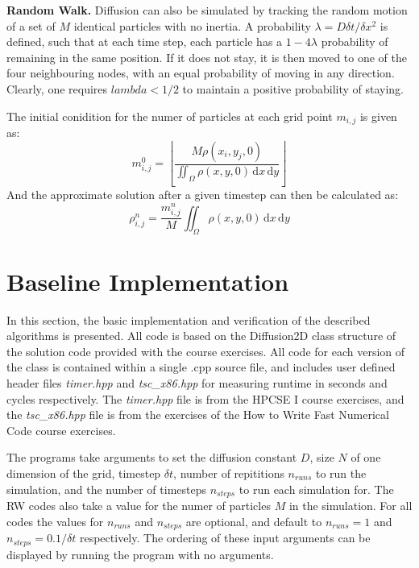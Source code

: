 \documentclass[letterpaper]{article}
\newcommand{\mypar}[1]{{\bf #1.}}
\begin{document}
\mypar{Random Walk}
Diffusion can also be simulated by tracking the random motion of a set of $M$ identical particles with no inertia. A probability $\lambda=D\delta t/\delta x^2$ is defined, such that at each time step, each particle has a $1-4\lambda$ probability of remaining in the same position. If it does not stay, it is then moved to one of the four neighbouring nodes, with an equal probability of moving in any direction. Clearly, one requires $lambda<1/2$ to maintain a positive probability of staying.

The initial conidition for the numer of particles at each grid point $m_{i,j}$ is given as:
\begin{equation}
m_{i,j}^0=\left \lfloor{\frac{M\rho(x_i,y_j,0)}{\iint_\Omega \rho(x,y,0) \,\mathrm{d}x\,\mathrm{d}y}}\right \rfloor 
\end{equation}
And the approximate solution after a given timestep can then be calculated as:
\begin{equation}
\rho_{i,j}^n=\frac{m_{i,j}^n}{M}\iint_\Omega \rho(x,y,0)  \,\mathrm{d}x\,\mathrm{d}y
\end{equation}

\section{Baseline Implementation}\label{sec:baseline}

In this section, the basic implementation and verification of the described algorithms is presented. All code is based on the Diffusion2D class structure of the solution code provided with the course exercises. All code for each version of the class is contained within a single .cpp source file, and includes user defined header files \textit{timer.hpp} and \textit{tsc\_x86.hpp} for measuring runtime in seconds and cycles respectively. The \textit{timer.hpp} file is from the HPCSE I course exercises, and the \textit{tsc\_x86.hpp} file is from the exercises of the How to Write Fast Numerical Code course exercises.

The programs take arguments to set the diffusion constant $D$, size $N$ of one dimension of the grid, timestep $\delta t$, number of repititions $n_{runs}$ to run the simulation, and the number of timesteps $n_{steps}$ to run each simulation for. The RW codes also take a value for the numer of particles $M$ in the simulation. For all codes the values for $n_{runs}$ and $n_{steps}$ are optional, and default to $n_{runs}=1$ and $n_{steps}=0.1/\delta t$ respectively. The ordering of these input arguments can be displayed by running the program with no arguments.
\end{document}
